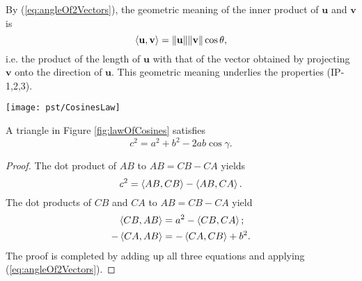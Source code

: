 \begin{rem}
  By (\ref{eq:angleOf2Vectors}),
  the geometric meaning of the inner product of $\mathbf{u}$
  and $\mathbf{v}$ is   
  \begin{displaymath}
    \left\langle \mathbf{u},\mathbf{v} \right\rangle = \|\mathbf{u}\| \|\mathbf{v}\|
    \cos\theta, 
  \end{displaymath}
  i.e. the product of the length of $\mathbf{u}$
  with that of the vector obtained by projecting $\mathbf{v}$
  onto the direction of $\mathbf{u}$.
  This geometric meaning underlies the properties
  (IP-1,2,3).
\end{rem}

\begin{Figure}
  \centering
  \texttt{[image: pst/CosinesLaw]}
  \label{fig:lawOfCosines}
\end{Figure}

\begin{thm}
  \label{thm:lawOfCosines}
  A triangle in Figure \ref{fig:lawOfCosines} satisfies
  \begin{equation}
    \label{eq:lawOfCosines}
    c^2 = a^2 + b^2 -2ab\cos\gamma.
  \end{equation}
\end{thm}
\begin{proof}
  The dot product of $AB$ to $AB=CB-CA$ yields
  \begin{displaymath}
    c^2 = \left\langle AB, CB \right\rangle - \left\langle AB,CA \right\rangle.
  \end{displaymath}
  The dot products of $CB$ and $CA$ to $AB=CB-CA$ yield
  \begin{align*}
    \left\langle CB, AB \right\rangle &= a^2 - \left\langle CB,CA \right\rangle;
    \\
    -\left\langle CA, AB \right\rangle &= -\left\langle CA, CB \right\rangle + b^2.
  \end{align*}
  The proof is completed by adding up all three equations
  and applying (\ref{eq:angleOf2Vectors}).
\end{proof}

